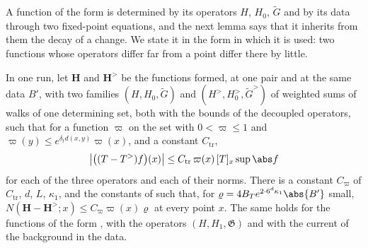 A function of the form \cite[(179), (180)]{BalabanVAR} is determined by its operators $H$, $H_0$, $\tilde G$ and by its data through two fixed-point equations, and the next lemma says that it inherits from them the decay of a change. We state it in the form in which it is used: two functions whose operators differ far from a point differ there by little.

\begin{lemma}\label{lem:function-truncation}
In one run, let $\mathbf H$ and $\mathbf H^>$ be the functions \cite[(1.2)--(1.6)]{BalabanRG2} formed, at one pair and at the same data $B'$, with two families $(H, H_0, \tilde G)$ and $(H^>, H^>_0, \tilde G^>)$ of weighted sums of walks of one determining set, both with the bounds \cite[(1.18)]{BalabanRG2} of the decoupled operators, such that for a function $\varpi$ on the set with $0 < \varpi \leq 1$ and $\varpi(y) \leq e^{\delta_td(x,y)}\varpi(x)$, and a constant $C_{\mathrm{tr}}$,
\begin{equation}\label{eq:operator-truncation}
    \bigl\lvert\bigl((T - T^>)f\bigr)(x)\bigr\rvert \leq C_{\mathrm{tr}}\,\varpi(x)\,[T]_x\sup\abs f
\end{equation}
for each of the three operators and each of their norms. There is a constant $C_\varpi$ of $C_{\mathrm{tr}}$, $d$, $L$, $\kappa_1$, and the constants of \cite{BalabanPBG, BalabanVAR} such that, for $\varrho = 4B_Te^{2\cdot6^d\kappa_1}\abs{B'}$ small, $N(\mathbf H - \mathbf H^>; x) \leq C_\varpi\varpi(x)\varrho$ at every point $x$. The same holds for the functions of the form \cite[(111), (112)]{BalabanVAR}, with the operators $(H, H_1, \mathfrak G)$ and with the current of the background in the data.
\end{lemma}

